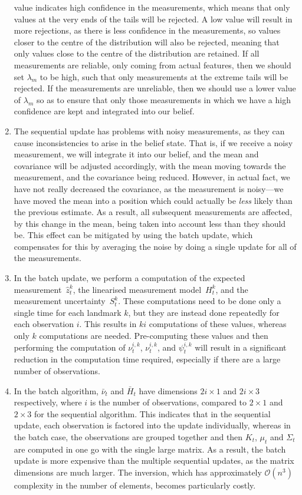 \documentclass[a4paper,12pt]{article}
\begin{document}
\begin{enumerate}[resume]
  value indicates high confidence in the measurements, which means that only
  values at the very ends of the tails will be rejected. A low value will result
  in more rejections, as there is less confidence in the measurements, so values
  closer to the centre of the distribution will also be rejected, meaning that
  only values close to the centre of the distribution are retained. If all
  measurements are reliable, only coming from actual features, then we should
  set $\lambda_m$ to be high, such that only measurements at the extreme tails
  will be rejected. If the measurements are unreliable, then we should use a
  lower value of $\lambda_m$ so as to ensure that only those measurements in
  which we have a high confidence are kept and integrated into our belief.
\item The sequential update has problems with noisy measurements, as they can
  cause inconsistencies to arise in the belief state. That is, if we receive a
  noisy measurement, we will integrate it into our belief, and the mean and
  covariance will be adjusted accordingly, with the mean moving towards the
  measurement, and the covariance being reduced. However, in actual fact, we
  have not really decreased the covariance, as the measurement is noisy---we
  have moved the mean into a position which could actually be \emph{less} likely
  than the previous estimate. As a result, all subsequent measurements are
  affected, by this change in the mean, being taken into account less than they
  should be. This effect can be mitigated by using the batch update,
  which compensates for this by averaging the noise by doing a single update for
  all of the measurements.
\item In the batch update, we perform a computation of the expected
  measurement~$\hat{z}_t^k$, the linearised measurement model~$H_t^k$, and the
  measurement uncertainty~$S_t^k$. These computations need to be done only a
  single time for each landmark $k$, but they are instead done repeatedly for
  each observation $i$. This results in $ki$ computations of these values,
  whereas only $k$ computations are needed. Pre-computing these values and then
  performing the computation of $\nu_t^{i,k}$, $\nu_t^{i,k}$, and $\psi_t^{i,k}$
  will result in a significant reduction in the computation time required,
  especially if there are a large number of observations.
\item In the batch algorithm, $\bar{\nu}_t$ and $\bar{H}_t$ have dimensions
  $2i\times 1$ and $2i\times 3$ respectively, where $i$ is the number of
  observations, compared to $2\times 1$ and $2\times 3$ for the sequential
  algorithm. This indicates that in the sequential update, each observation is
  factored into the update individually, whereas in the batch case, the
  observations are grouped together and then $K_t$, $\mu_t$ and $\Sigma_t$ are
  computed in one go with the single large matrix. As a result, the batch update
  is more expensive than the multiple sequential updates, as the matrix
  dimensions are much larger. The inversion, which has approximately
  $\mathcal{O}(n^3)$ complexity in the number of elements, becomes particularly
  costly.
\end{enumerate}
\end{document}
